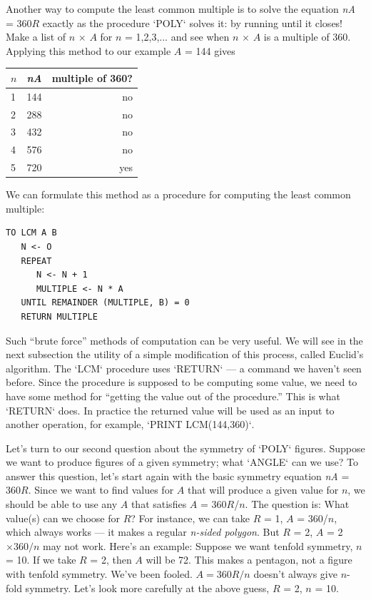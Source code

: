\documentclass{book}
\begin{document}
Another way to compute the least common multiple is to solve the
equation {\em nA} = 360$R$ exactly as the procedure \textsc{`POLY`} solves it: by running until it closes! Make a list of $n$ $\times$ $A$ for $n$ = 1,2,3,... and see
when $n$ $\times$ $A$ is a multiple of 360. Applying this method to our example
$A$ = 144 gives

\begin{tabular}{l c r} 
$n$ & {\em nA} & multiple of 360? \\
\hline
1 & 144 & no \\
2 & 288 & no \\
3 & 432 & no \\
4 & 576 & no \\
5 & 720 & yes \\
\end{tabular}

We can formulate this method as a procedure for computing the least
common multiple:

\begin{verbatim}
TO LCM A B
   N <- O
   REPEAT
      N <- N + 1
      MULTIPLE <- N * A
   UNTIL REMAINDER (MULTIPLE, B) = 0
   RETURN MULTIPLE
\end{verbatim}
Such ``brute force'' methods of computation can be very useful. We will
see in the next subsection the utility of a simple modification of this
process, called Euclid's algorithm. The \textsc{`LCM`} procedure uses \textsc{`RETURN`} --- a
command we haven't seen before. Since the procedure is supposed to
be computing some value, we need to have some method for ``getting
the value out of the procedure.'' This is what \textsc{`RETURN`} does. In practice
the returned value will be used as an input to another operation, for
example, \textsc{`PRINT LCM(144,360)`}.

Let's turn to our second question about the symmetry of \textsc{`POLY`} figures.
Suppose we want to produce figures of a given symmetry; what \textsc{`ANGLE`}
can we use? To answer this question, let's start again with the basic
symmetry equation {\em nA} = 360$R$. Since we want to find values for $A$ that
will produce a given value for $n$, we should be able to use any $A$ that
satisfies $A$ = 360$R$/$n$. The question is: What value(s) can we choose
for $R$? For instance, we can take $R$ = 1, $A$ = 360/$n$, which always
works --- it makes a regular {\em n-sided polygon}. But $R$ = 2, $A$ = 2 $\times 360 / n$
may not work. Here's an example: Suppose we want tenfold symmetry,
$n$ = 10. If we take $R$ = 2, then $A$ will be 72. This makes a pentagon,
not a figure with tenfold symmetry.
We've been fooled. $A = 360R/n$ doesn't always give $n$-fold symmetry.
Let's look more carefully at the above guess, $R$ = 2, $n$ = 10.
\end{document}
